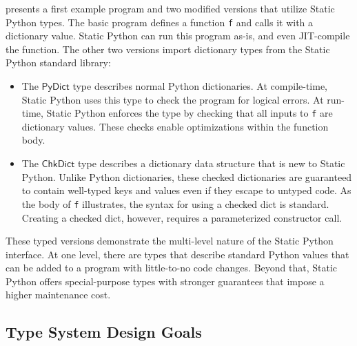 \documentclass[english,cleveref,submission]{programming}
\newcommand{\SP}{Static Python}
\newcommand{\code}[1]{\texttt{#1}}
\newcommand{\typefont}[1]{\mathsf{#1}}
\newcommand{\sptrawpydict}{\typefont{PyDict}}
\newcommand{\sptrawchkdict}{\typefont{ChkDict}} %
\begin{document}
 presents a first example program and two modified versions that
utilize \SP{} types.
The basic program defines a function \code{f} and calls it with a dictionary
value.
\SP{} can run this program as-is, and even JIT-compile the function.
The other two versions import dictionary types from the \SP{} standard library:
\begin{itemize}
  \item
    The $\sptrawpydict$ type describes normal Python dictionaries.
    At compile-time, \SP{} uses this type to check the program for logical errors.
    At run-time, \SP{} enforces the type by checking that all inputs to \code{f} are
    dictionary values.
    These checks enable optimizations within the function body.

  \item
    The $\sptrawchkdict$ type describes a dictionary data structure that is new to \SP{}.
    Unlike Python dictionaries, these checked dictionaries are guaranteed to
    contain well-typed keys and values even if they escape to untyped code.
    As the body of \code{f} illustrates, the syntax for using a checked dict is standard.
    Creating a checked dict, however, requires a parameterized constructor call.
\end{itemize}
These typed versions demonstrate the multi-level nature of the \SP{} interface.
At one level, there are types that describe standard Python values that can be added
to a program with little-to-no code changes.
Beyond that, \SP{} offers special-purpose types with stronger guarantees that impose
a higher maintenance cost.


\subsection{Type System Design Goals}
\end{document}
